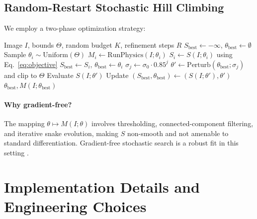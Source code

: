 \documentclass[11pt,a4paper]{article}
\begin{document}
\subsection{Random-Restart Stochastic Hill Climbing}
We employ a two-phase optimization strategy:
\begin{algorithm}
\caption{Stochastic Parameter Optimization (per image)}
\begin{algorithmic}[1]
\REQUIRE Image $I$, bounds $\Theta$, random budget $K$, refinement steps $R$
\STATE $S_{\mathrm{best}} \leftarrow -\infty$, $\theta_{\mathrm{best}}\leftarrow \emptyset$
    \STATE Sample $\theta_i \sim \mathrm{Uniform}(\Theta)$
    \STATE $M_i \leftarrow \mathrm{RunPhysics}(I;\theta_i)$
    \STATE $S_i \leftarrow S(I;\theta_i)$ using Eq.~\eqref{eq:objective}
        \STATE $S_{\mathrm{best}}\leftarrow S_i$, $\theta_{\mathrm{best}}\leftarrow \theta_i$
    \ENDIF
\ENDFOR
{}
    \STATE $\sigma_j \leftarrow \sigma_0 \cdot 0.85^j$ 
    \STATE $\theta' \leftarrow \mathrm{Perturb}(\theta_{\mathrm{best}};\sigma_j)$ and clip to $\Theta$
    \STATE Evaluate $S(I;\theta')$
        \STATE Update $(S_{\mathrm{best}},\theta_{\mathrm{best}})\leftarrow (S(I;\theta'),\theta')$
    \ENDIF
\ENDFOR
\RETURN $\theta_{\mathrm{best}}, M(I;\theta_{\mathrm{best}})$
\end{algorithmic}
\end{algorithm}

\paragraph{Why gradient-free?}
The mapping $\theta \mapsto M(I;\theta)$ involves thresholding, connected-component filtering, and iterative snake evolution, making $S$ non-smooth and not amenable to standard differentiation. Gradient-free stochastic search is a robust fit in this setting \citep{yu2020hyperparam}.

\section{Implementation Details and Engineering Choices}
\end{document}
